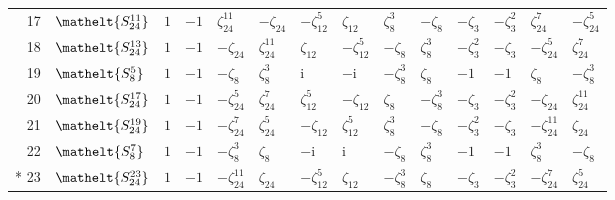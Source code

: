 \documentclass[10pt,a4paper]{article}
\numberwithin{equation}{section}
\newcommand{\eltfont}[1]{{\let\sigma\eltsigma\mathelt{#1}}}
\newcommand{\cls}[1]{\eltfont{#1}}
\newcommand{\iunit}{\mathrm{i}}
\newcommand{\rootunity}[1]{\zeta_{#1}}
\begin{document}
{\begin{longtable}{@{}rlllllllllllll@{}}
17 & $\cls{S_{24}^{11}}$ & $1$ & $-1$ & $\rootunity{24}^{11}$ & $-\rootunity{24}$ & $-\rootunity{12}^{5}$ & $\rootunity{12}$ & $\rootunity{8}^{3}$ & $-\rootunity{8}$ & $-\rootunity{3}$ & $-\rootunity{3}^{2}$ & $\rootunity{24}^{7}$ & $-\rootunity{24}^{5}$\\
18 & $\cls{S_{24}^{13}}$ & $1$ & $-1$ & $-\rootunity{24}$ & $\rootunity{24}^{11}$ & $\rootunity{12}$ & $-\rootunity{12}^{5}$ & $-\rootunity{8}$ & $\rootunity{8}^{3}$ & $-\rootunity{3}^{2}$ & $-\rootunity{3}$ & $-\rootunity{24}^{5}$ & $\rootunity{24}^{7}$\\
19 & $\cls{S_{8}^{5}}$ & $1$ & $-1$ & $-\rootunity{8}$ & $\rootunity{8}^{3}$ & $\iunit{}$ & $-\iunit{}$ & $-\rootunity{8}^{3}$ & $\rootunity{8}$ & $-1$ & $-1$ & $\rootunity{8}$ & $-\rootunity{8}^{3}$\\
20 & $\cls{S_{24}^{17}}$ & $1$ & $-1$ & $-\rootunity{24}^{5}$ & $\rootunity{24}^{7}$ & $\rootunity{12}^{5}$ & $-\rootunity{12}$ & $\rootunity{8}$ & $-\rootunity{8}^{3}$ & $-\rootunity{3}$ & $-\rootunity{3}^{2}$ & $-\rootunity{24}$ & $\rootunity{24}^{11}$\\
21 & $\cls{S_{24}^{19}}$ & $1$ & $-1$ & $-\rootunity{24}^{7}$ & $\rootunity{24}^{5}$ & $-\rootunity{12}$ & $\rootunity{12}^{5}$ & $\rootunity{8}^{3}$ & $-\rootunity{8}$ & $-\rootunity{3}^{2}$ & $-\rootunity{3}$ & $-\rootunity{24}^{11}$ & $\rootunity{24}$\\
22 & $\cls{S_{8}^{7}}$ & $1$ & $-1$ & $-\rootunity{8}^{3}$ & $\rootunity{8}$ & $-\iunit{}$ & $\iunit{}$ & $-\rootunity{8}$ & $\rootunity{8}^{3}$ & $-1$ & $-1$ & $\rootunity{8}^{3}$ & $-\rootunity{8}$\\*
23 & $\cls{S_{24}^{23}}$ & $1$ & $-1$ & $-\rootunity{24}^{11}$ & $\rootunity{24}$ & $-\rootunity{12}^{5}$ & $\rootunity{12}$ & $-\rootunity{8}^{3}$ & $\rootunity{8}$ & $-\rootunity{3}$ & $-\rootunity{3}^{2}$ & $-\rootunity{24}^{7}$ & $\rootunity{24}^{5}$\\
\bottomrule\end{longtable}}
\end{document}
